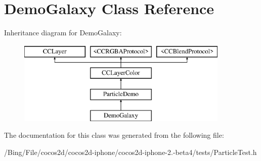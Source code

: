 \hypertarget{interface_demo_galaxy}{\section{Demo\-Galaxy Class Reference}
\label{interface_demo_galaxy}
}
Inheritance diagram for Demo\-Galaxy\-:\begin{figure}[H]
\begin{center}
\leavevmode
\includegraphics[height=4.000000cm]{interface_demo_galaxy}
\end{center}
\end{figure}


The documentation for this class was generated from the following file\-:\begin{DoxyCompactItemize}
\item 
/\-Bing/\-File/cocos2d/cocos2d-\/iphone/cocos2d-\/iphone-\/2.-\/beta4/tests/Particle\-Test.\-h\end{DoxyCompactItemize}
